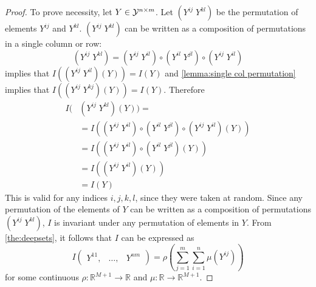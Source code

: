 \begin{appendices}
\begin{proof}
To prove necessity, let $Y \in \mathcal{Y}^{n \times m}$. Let $(Y^{ij}\; Y^{kl})$ be the permutation of elements $Y^{ij}$ and $Y^{kl}$. $(Y^{ij}\; Y^{kl})$ can be written as a composition of permutations in a single column or row:
\begin{equation}
    (Y^{ij}\; Y^{kl}) = (Y^{ij}\; Y^{il}) \circ (Y^{il}\; Y^{jl}) \circ (Y^{ij}\; Y^{il})
\end{equation}
 implies that $I((Y^{ij}\; Y^{il})(Y)) = I(Y)$ and \cref{lemma:single col permutation} implies that $I((Y^{ij}\; Y^{kj})(Y)) = I(Y)$. Therefore
\begin{align}
I(&(Y^{ij}\; Y^{kl})(Y))=\nonumber\\
&=I((Y^{ij}\; Y^{il}) \circ (Y^{il}\; Y^{jl}) \circ (Y^{ij}\; Y^{il})(Y))\nonumber\\
&=I((Y^{ij}\; Y^{il}) \circ (Y^{il}\; Y^{jl})(Y))\nonumber\\
&=I((Y^{ij}\; Y^{il}) (Y))\nonumber\\
&=I(Y)
\end{align}
This is valid for any indices $i,j,k,l$, since they were taken at random.
Since any permutation of the elements of $Y$ can be written as a composition of permutations $(Y^{ij}\; Y^{kl})$, $I$ is invariant under any permutation of elements in $Y$. From \cref{the:deepsets}, it follows that $I$ can be expressed as
\begin{equation}
    I\begin{pmatrix}
        Y^{11}, & \dots, & Y^{nm}
    \end{pmatrix}
    = \rho\left(\sum_{j=1}^m\sum_{i=1}^n\mu(Y^{ij})\right)
\end{equation}
for some continuous $\rho \colon \mathbb{R}^{M+1}\to \mathbb{R}$ and $\mu \colon \mathbb{R}\to \mathbb{R}^{M+1}$.
\end{proof}


\end{appendices}
